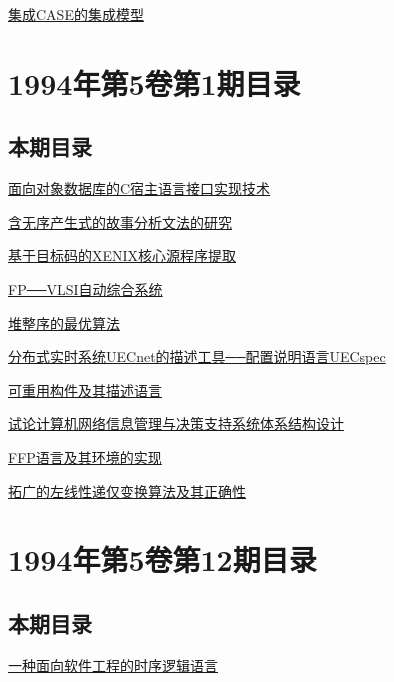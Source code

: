 \documentclass[a4paper]{article}
\begin{document}
\href{http://www.jos.org.cn/ch/reader/download_pdf.aspx?file_no=19940209&year_id=1994&quarter_id=2&falg=1}{集成CASE的集成模型}


\section{\textbf{1994年第5卷第1期目录}}
\subsection{本期目录}
\href{http://www.jos.org.cn/ch/reader/download_pdf.aspx?file_no=19940101&year_id=1994&quarter_id=1&falg=1}{面向对象数据库的C宿主语言接口实现技术}

\href{http://www.jos.org.cn/ch/reader/download_pdf.aspx?file_no=19940102&year_id=1994&quarter_id=1&falg=1}{含无序产生式的故事分析文法的研究}

\href{http://www.jos.org.cn/ch/reader/download_pdf.aspx?file_no=19940103&year_id=1994&quarter_id=1&falg=1}{基于目标码的XENIX核心源程序提取}

\href{http://www.jos.org.cn/ch/reader/download_pdf.aspx?file_no=19940104&year_id=1994&quarter_id=1&falg=1}{FP──VLSI自动综合系统}

\href{http://www.jos.org.cn/ch/reader/download_pdf.aspx?file_no=19940105&year_id=1994&quarter_id=1&falg=1}{堆整序的最优算法}

\href{http://www.jos.org.cn/ch/reader/download_pdf.aspx?file_no=19940106&year_id=1994&quarter_id=1&falg=1}{分布式实时系统UECnet的描述工具──配置说明语言UECspec}

\href{http://www.jos.org.cn/ch/reader/download_pdf.aspx?file_no=19940107&year_id=1994&quarter_id=1&falg=1}{可重用构件及其描述语言}

\href{http://www.jos.org.cn/ch/reader/download_pdf.aspx?file_no=19940108&year_id=1994&quarter_id=1&falg=1}{试论计算机网络信息管理与决策支持系统体系结构设计}

\href{http://www.jos.org.cn/ch/reader/download_pdf.aspx?file_no=19940109&year_id=1994&quarter_id=1&falg=1}{FFP语言及其环境的实现}

\href{http://www.jos.org.cn/ch/reader/download_pdf.aspx?file_no=19940110&year_id=1994&quarter_id=1&falg=1}{拓广的左线性递仅变换算法及其正确性}


\section{\textbf{1994年第5卷第12期目录}}
\subsection{本期目录}
\href{http://www.jos.org.cn/ch/reader/download_pdf.aspx?file_no=19941201&year_id=1994&quarter_id=12&falg=1}{一种面向软件工程的时序逻辑语言}
\end{document}
